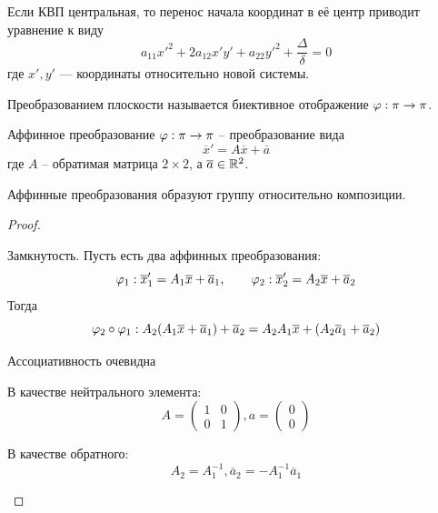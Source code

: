 \begin{Def}
	Если КВП центральная, то перенос начала координат в её центр приводит уравнение к виду
	$$a_{11}x'^2 + 2a_{12}x'y' + a_{22}y'^2 + \frac{\Delta}{\delta} = 0$$
	где $x', y'$ — координаты относительно новой системы. 
\end{Def}



\begin{Def}
	Преобразованием плоскости называется биективное отображение $\varphi : \pi \to \pi$. 
\end{Def}

\begin{Def}
	Аффинное преобразование $\varphi : \pi \to \pi$ -- преобразование вида
	\[\overline{x}' = A \overline{x} + \overline{a}\]
	где $A$ -- обратимая матрица $2 \times 2$, а $\overline{a} \in \mathbb{R}^2$. 
\end{Def}

\begin{Thm}
	Аффинные преобразования образуют группу относительно композиции.
\end{Thm}

\begin{proof}
	\begin{MyList}
		\item Замкнутость. Пусть есть два аффинных преобразования:
		\[\varphi_1 : \overline{x}'_1 = A_1 \overline{x} + \overline{a}_1, \qquad \varphi_2 : \overline{x}'_2 = A_2 \overline{x} + \overline{a}_2\] 
		Тогда
		\[\varphi_2 \circ \varphi_1 : A_2(A_1 \overline{x} + \overline{a}_1) + \overline{a}_2 = A_2 A_1 \overline{x} + (A_2 \overline{a}_1 + \overline{a}_2)\]
		\item Ассоциативность очевидна
		\item В качестве нейтрального элемента:
		\[A = \left(\begin{array}{cc}
		1 & 0 \\ 
		0 & 1
		\end{array}\right), a = \left(\begin{array}{c}
		0 \\ 
		0
		\end{array}\right)\]
		\item В качестве обратного:
		\[A_2 = A_1^{-1}, \overline{a}_2 = -A_1^{-1} \overline{a}_1\]
	\end{MyList}
\end{proof}

